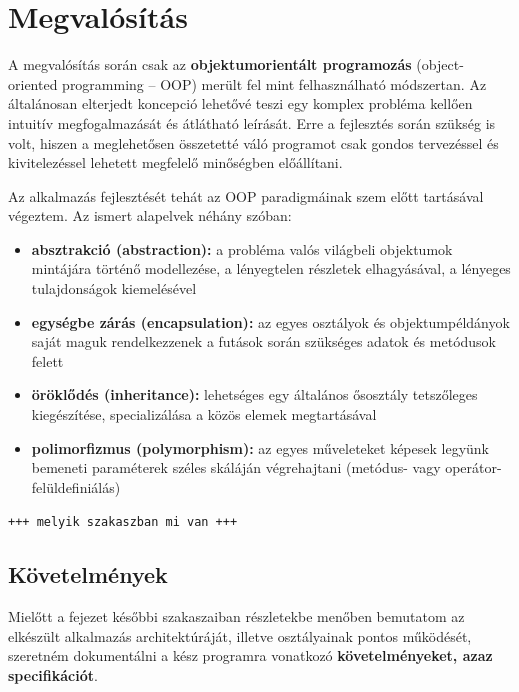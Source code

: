 \chapter{Megvalósítás}\label{sect:megvalositas}

A megvalósítás során csak az \textbf{objektumorientált programozás} (object-oriented programming -- OOP) merült fel mint felhasználható módszertan. Az általánosan elterjedt koncepció lehetővé teszi egy komplex probléma kellően intuitív megfogalmazását és átlátható leírását. Erre a fejlesztés során szükség is volt, hiszen a meglehetősen összetetté váló programot csak gondos tervezéssel és kivitelezéssel lehetett megfelelő minőségben előállítani.

Az alkalmazás fejlesztését tehát az OOP paradigmáinak szem előtt tartásával végeztem. Az ismert alapelvek néhány szóban:

\begin{itemize}
  \item \textbf{absztrakció (abstraction):} a probléma valós világbeli objektumok mintájára történő modellezése, a lényegtelen részletek elhagyásával, a lényeges tulajdonságok kiemelésével
  \item \textbf{egységbe zárás (encapsulation):} az egyes osztályok és objektumpéldányok saját maguk rendelkezzenek a futások során szükséges adatok és metódusok felett
  \item \textbf{öröklődés (inheritance):} lehetséges egy általános ősosztály tetszőleges kiegészítése, specializálása a közös elemek megtartásával
  \item \textbf{polimorfizmus (polymorphism):} az egyes műveleteket képesek legyünk bemeneti paraméterek széles skáláján végrehajtani (metódus- vagy operátor-felüldefiniálás)
\end{itemize}

\bigskip

\texttt{+++ melyik szakaszban mi van +++}

\section{Követelmények}\label{sect:kovetelmenyek}

Mielőtt a fejezet későbbi szakaszaiban részletekbe menőben bemutatom az elkészült alkalmazás architektúráját, illetve osztályainak pontos működését, szeretném dokumentálni a kész programra vonatkozó \textbf{követelményeket, azaz specifikációt}.


